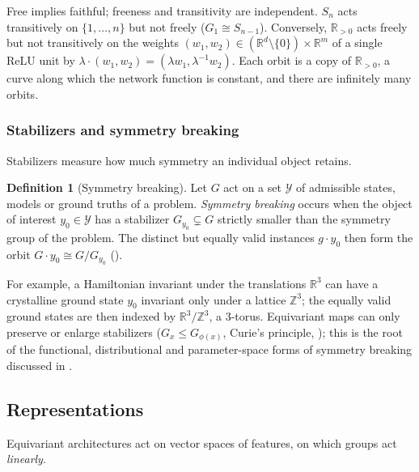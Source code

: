 \documentclass[11pt]{article}
\theoremstyle{plain}
\theoremstyle{definition}
\newtheorem{Definition}{Definition}[section]
\begin{document}
Free implies faithful; freeness and transitivity are independent.
$S_n$ acts transitively on $\{1,\dots,n\}$ but not freely ($G_1\cong S_{n-1}$).
Conversely, $\mathbb{R}_{>0}$ acts freely but not transitively on the weights $(w_1,w_2)\in(\mathbb{R}^d\setminus\{0\})\times\mathbb{R}^m$ of a single ReLU unit by $\lambda\cdot(w_1,w_2) = (\lambda w_1,\lambda^{-1}w_2)$.
Each orbit is a copy of $\mathbb{R}_{>0}$, a curve along which the network function is constant, and there are infinitely many orbits.

\subsubsection{Stabilizers and symmetry breaking}
\label{subsec:symmetry-breaking}

Stabilizers measure how much symmetry an individual object retains.

\begin{Definition}[Symmetry breaking]\label{def:symmetry-breaking}
Let $G$ act on a set $\mathcal{Y}$ of admissible states, models or ground truths of a problem.
\emph{Symmetry breaking} occurs when the object of interest $y_0\in\mathcal{Y}$ has a stabilizer $G_{y_0}\subsetneq G$ strictly smaller than the symmetry group of the problem.
The distinct but equally valid instances $g\cdot y_0$ then form the orbit $G\cdot y_0\cong G/G_{y_0}$ ().
\end{Definition}

For example, a Hamiltonian invariant under the translations $\mathbb{R}^3$ can have a crystalline ground state $y_0$ invariant only under a lattice $\mathbb{Z}^3$; the equally valid ground states are then indexed by $\mathbb{R}^3/\mathbb{Z}^3$, a 3-torus.
Equivariant maps can only preserve or enlarge stabilizers ($G_x\leq G_{\phi(x)}$, Curie's principle, ); this is the root of the functional, distributional and parameter-space forms of symmetry breaking discussed in .


%
\subsection{Representations}
\label{subsec:representation-theory}

Equivariant architectures act on vector spaces of features, on which groups act \emph{linearly}.
\end{document}
